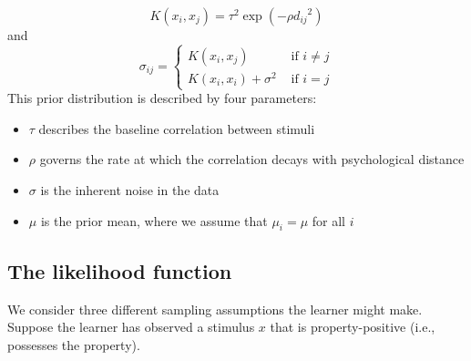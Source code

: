 \documentclass[
  english,
  doc]{apa6}
\providecommand{\tightlist}{%
  \setlength{\itemsep}{0pt}\setlength{\parskip}{0pt}}
\begin{document}
\[
K(x_i, x_j) = \tau^2 \exp\left(-\rho {d_{ij}}^2\right)
\]
and
\[
\sigma_{ij} = \left\{ \begin{array}{rl} K(x_i, x_j) & \mbox{ if } i \neq j \\ K(x_i, x_i) + \sigma^2 & \mbox{ if } i = j \end{array}  \right.
\]
\noindent
This prior distribution is described by four parameters:

\begin{itemize}
\tightlist
\item
  \(\tau\) describes the baseline correlation between stimuli
\item
  \(\rho\) governs the rate at which the correlation decays with psychological distance
\item
  \(\sigma\) is the inherent noise in the data
\item
  \(\mu\) is the prior mean, where we assume that \(\mu_i = \mu\) for all \(i\)
\end{itemize}

\hypertarget{the-likelihood-function}{%
\subsection{The likelihood function}\label{the-likelihood-function}}

\noindent
We consider three different sampling assumptions the learner might make. Suppose the learner has observed a stimulus \(x\) that is property-positive (i.e., possesses the property).
\end{document}
